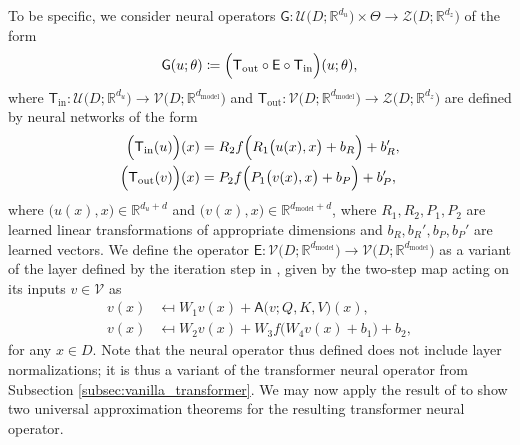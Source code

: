 \documentclass[twoside]{article}
\newcommand{\1}{\mathbbm{1}}
\newcommand{\R}{\mathbbm{R}}
\newcommand{\cU}{\mathcal{U}}
\newcommand{\cZ}{\mathcal{Z}}
\newcommand{\cV}{\mathcal{V}}
\newcommand{\sA}{\mathsf{A}}
\newcommand{\sT}{\mathsf{T}}
\newcommand{\sE}{\mathsf{E}}
\newcommand{\sG}{\mathsf{G}}
\providecommand{\mathbbm}{\mathbb} %
\begin{document}
To be specific, we consider neural operators $\sG:\cU\bigl(D;\R^{d_u} \bigr)\times\Theta \to \cZ\bigl( D;\R^{d_z}\bigr)$ of the form
\begin{equation}
\label{eq:transformer_operator_approx_theory}
\sG(u;\theta) \coloneqq \Bigl(\sT_{\textrm{out}}\circ \sE \circ \sT_{\textrm{in}}\Bigr) (u;\theta),
\end{equation}
where $\sT_{\textrm{in}}: \cU\bigl(D;\R^{d_u} \bigr) \to \cV\bigl(D;\R^{d_\textrm{model}} \bigr)$ and $\sT_{\textrm{out}}: \cV\bigl(D;\R^{d_\textrm{model}}\bigr)\to\cZ\bigl(D;\R^{d_z} \bigr)$ are defined by neural networks of the form 
\begin{align}
    \Bigl(\sT_{\textrm{in}}(u)\Bigr)(x) &= R_2f\Bigl(R_1\bigl(u(x),x\bigr)+b_R \Bigr)+b_R',\\
    \Bigl(\sT_{\textrm{out}}(v)\Bigr)(x) &= P_2f\Bigl(P_1\bigl(v(x),x\bigr)+b_P \Bigr)+b_P',
\end{align}
where $\bigl(u(x),x\bigr)\in \R^{d_u+d}$ and $\bigl(v(x),x\bigr)\in \R^{d_{\textrm{model}}+d}$, where $R_1,R_2,P_1,P_2$ are learned linear transformations of appropriate dimensions and $b_R,b_R',b_P,b_P'$ are learned vectors. %
We define the operator $\sE: \cV\bigl(D;\R^{d_\textrm{model}} \bigr) \to \cV\bigl(D;\R^{d_\textrm{model}} \bigr)$ as a variant of the layer defined by the iteration step in , given by the two-step map acting on its inputs $v\in\cV$ as
\begin{subequations}
\label{eq:recurrence_enc_func_ua}
\begin{align}
    {v}(x) &\mapsfrom W_1{v}(x) + \sA\big({v}; Q,K,V\big)(x), \\
    v(x) &\mapsfrom W_2{v}(x) + W_3f\bigl(W_4{v}(x)+b_1\bigr) + b_2,
\end{align}
\end{subequations}
for any $x\in D$. Note that the neural operator thus defined does not include layer normalizations;
it is thus a variant of the transformer neural operator from Subsection \ref{subsec:vanilla_transformer}. 
We may now apply the result of \citet{lanthaler2023nonlocal} to show two universal approximation theorems for the resulting transformer neural operator.
\end{document}
